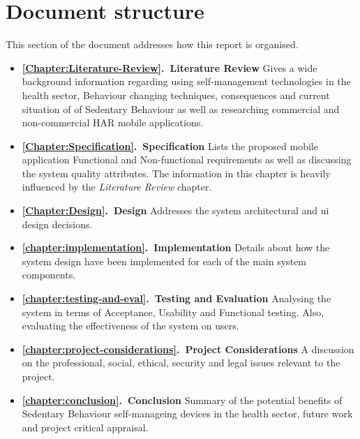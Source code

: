     \section{Document structure}
    This section of the document addresses how this report is organised.
    \begin{itemize}
        \item \textbf{\ref{Chapter:Literature-Review}.\ Literature Review} Gives a wide background information regarding using self-management technologies in the health sector, Behaviour changing techniques, consequences and current situation of of Sedentary Behaviour as well as researching commercial and non-commercial HAR mobile applications.
        \item \textbf{\ref{Chapter:Specification}.\ Specification} Lists the proposed mobile application Functional and Non-functional requirements as well as discussing the system quality attributes. The information in this chapter is heavily influenced by the \textit{Literature Review} chapter.
        \item \textbf{\ref{Chapter:Design}.\ Design} Addresses the system architectural and \gls{ui} design decisions.
        \item \textbf{\ref{chapter:implementation}.\ Implementation} Details about how the system design have been implemented for each of the main system components.
        \item \textbf{\ref{chapter:testing-and-eval}.\ Testing and Evaluation} Analysing the system in terms of Acceptance, Usability and Functional testing. Also, evaluating the effectiveness of the system on users.
        \item \textbf{\ref{chapter:project-considerations}.\ Project Considerations} A discussion on the professional, social, ethical, security and legal issues relevant to the project.
        \item \textbf{\ref{chapter:conclusion}.\ Conclusion} Summary of the potential benefits of Sedentary Behaviour self-manageing devices in the health sector, future work and project critical appraisal.
    \end{itemize}
